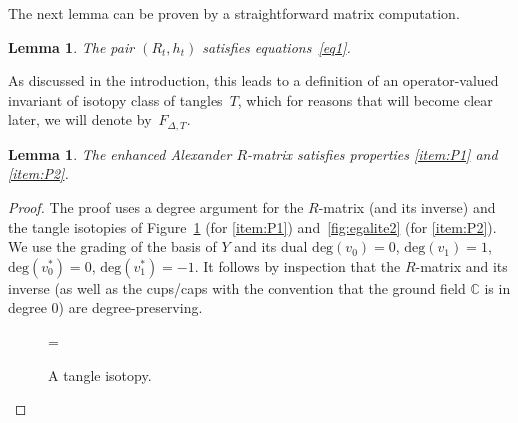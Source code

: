 \documentclass[10pt,a4paper]{amsart}
\numberwithin{equation}{section}
\newtheorem{Lemma}[Theorem]{Lemma}
\theoremstyle{definition}
\begin{document}
The next lemma can be proven by a straightforward matrix computation.

\begin{Lemma}
\label{lem.alex0}
The pair $(R_t,h_t)$ satisfies equations~\eqref{eq1}.
\end{Lemma}

As discussed in the introduction, this leads to a definition of an operator-valued
invariant of isotopy class of tangles~$T$, which for reasons that will
become clear later, we will denote by~$F_{\Delta,T}$.

\begin{Lemma}
\label{lem.alex1}
The enhanced Alexander $R$-matrix satisfies properties \eqref{item:P1} and
\eqref{item:P2}.
\end{Lemma}

\begin{proof}
The proof uses a degree argument for the $R$-matrix (and its inverse)
and the tangle isotopies of Figure~\ref{fig:egalite} (for \eqref{item:P1})
and~\ref{fig:egalite2} (for \eqref{item:P2}).
We use the grading of the basis of $Y$ {and its dual}
$\mathrm{deg}(v_0) = 0$, $\mathrm{deg}(v_1) = 1$, $\mathrm{deg}(v_0^\ast) = 0$, $\mathrm{deg}(v_1^\ast) = -1$.
It follows by inspection that the $R$-matrix
and its inverse (as well as the cups/caps {with the convention that the ground field $\mathbb{C}$ is in degree $0$}) are degree-preserving.
\begin{figure}[htpb!]
\centering{}
=
\caption{A tangle isotopy.}
\label{fig:egalite}
\end{figure}


\end{proof}
\end{document}
